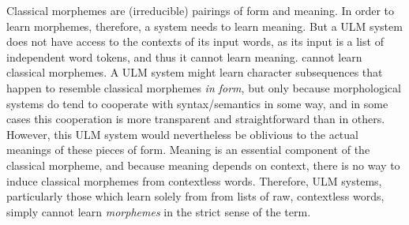 Classical morphemes are (irreducible) pairings of form and meaning.
In order to learn morphemes, therefore, a system needs to learn meaning. But a ULM system does not have access to
the contexts of its input words, as its input is a list of independent word tokens, and thus it cannot learn
meaning.
cannot learn classical morphemes. 
A ULM system might learn 
character subsequences that happen to resemble
 classical morphemes \emph{in form}, but only because morphological systems
do tend to cooperate with syntax/semantics in some way, and in some 
 cases this cooperation is more transparent and straightforward than
 in others.  However, this ULM system would nevertheless be oblivious to the actual meanings
 of these pieces of form. Meaning is an essential component of the classical morpheme, and because
 meaning depends on context, there is no way to induce classical morphemes from contextless words.
Therefore, ULM systems, particularly those which learn solely from 
from lists of raw, contextless words, simply cannot learn 
\emph{morphemes} in the strict sense of the term.

